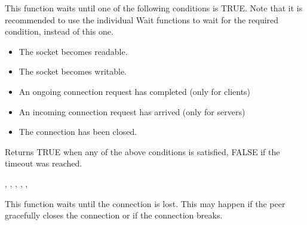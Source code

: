 %
%
\label{wxsocketbasewait}


This function waits until one of the following conditions is TRUE. Note
that it is recommended to use the individual Wait functions to wait for
the required condition, instead of this one.
                                            
\begin{itemize}
\item The socket becomes readable.
\item The socket becomes writable.
\item An ongoing connection request has completed (only for clients)
\item An incoming connection request has arrived (only for servers)
\item The connection has been closed.
\end{itemize}





Returns TRUE when any of the above conditions is satisfied,
FALSE if the timeout was reached.


, 
, 
, 
, 
, 

%
%
\label{wxsocketbasewaitforlost}


This function waits until the connection is lost. This may happen if
the peer gracefully closes the connection or if the connection breaks.


